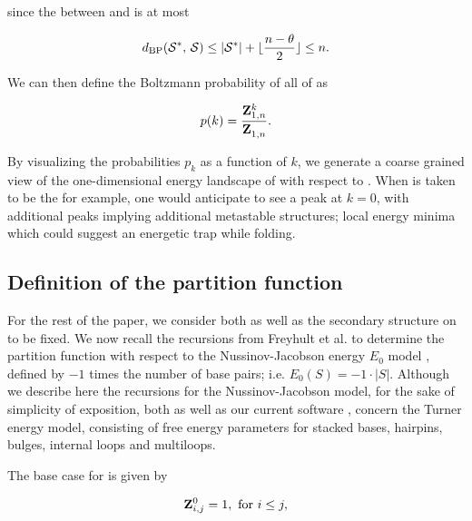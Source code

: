 since the \bpd between \strSt and \str is at most

\begin{align}
\label{eq:fftbor:maxDist}
\dBP{\strSt}{\str} \leq |\strSt| + \lfloor \frac{n-\theta}{2} \rfloor \leq n.
\end{align}

We can then define the Boltzmann probability of all \kNbrs of \strSt as

\begin{align}
\label{eq:fftbor:probK}
p(k) =\frac{\bfZ{k}{1,n}}{\bfZ{}{1,n}}.
\end{align}

By visualizing the probabilities $p_k$ as a function of $k$, we generate a
coarse grained view of the one-dimensional energy landscape of \seq with
respect to \strSt. When \strSt is taken to be the \mfes for example, one would
anticipate to see a peak at $k=0$, with additional peaks implying additional
metastable structures; local energy minima which could suggest an energetic
trap while folding.

\subsection{Definition of the partition function
\texorpdfstring{}{}}
\label{subsec:fftbor:recursions}

For the rest of the paper, we consider both \seq as well as the
secondary structure \strSt on \seq to be fixed. We now recall the
recursions from Freyhult et al. \cite{Freyhult.ab05} to determine
the partition function  with
respect to the Nussinov-Jacobson
energy $E_0$ model \cite{nussinovjacobson}, defined by
$-1$ times the number of base pairs; i.e. $E_0(S) = -1 \cdot |S|$.
Although we describe here the recursions for the Nussinov-Jacobson
model, for the sake of
simplicity of exposition, both \rnabor
\cite{Freyhult.ab05} as well as our current software \fftbor,
concern the Turner energy model, consisting of free energy parameters for
stacked bases, hairpins, bulges, internal loops and multiloops.


The base case for  is given by

\begin{align}
\label{eq:fftbor:initZpart1}
\bfZ{0}{i,j} = 1, \text{ for } i \le j,
\end{align}

